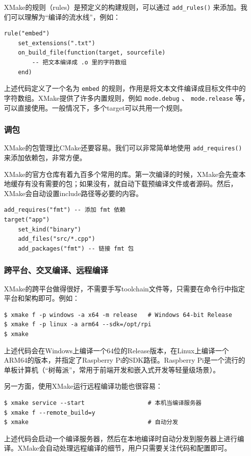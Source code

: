 XMake的规则（rules）是预定义的构建规则，可以通过 \texttt{add\_rules()} 来添加。我们可以理解为“编译的流水线”，例如：
\begin{verbatim}
rule("embed")
    set_extensions(".txt")
    on_build_file(function(target, sourcefile)
        -- 把文本编译成 .o 里的字符数组
    end)
\end{verbatim}
上述代码定义了一个名为 \texttt{embed} 的规则，作用是将文本文件编译成目标文件中的字符数组。XMake提供了许多内置规则，例如 \texttt{mode.debug} 、 \texttt{mode.release} 等，可以直接使用。一般情况下，多个target可以共用一个规则。

\subsubsection{调包}

XMake的包管理比CMake还要容易。我们可以非常简单地使用 \texttt{add\_requires()} 来添加依赖包，非常方便。

XMake的官方仓库有着九百多个常用的库。第一次编译的时候，XMake会先查本地缓存有没有需要的包；如果没有，就自动下载预编译文件或者源码。然后，XMake会自动设置include路径等必要的内容。

\begin{verbatim}
add_requires("fmt") -- 添加 fmt 依赖
target("app")
    set_kind("binary")
    add_files("src/*.cpp")
    add_packages("fmt") -- 链接 fmt 包
\end{verbatim}

\subsubsection{跨平台、交叉编译、远程编译}

XMake的跨平台做得很好，不需要手写toolchain文件等，只需要在命令行中指定平台和架构即可。例如：
\begin{verbatim}
$ xmake f -p windows -a x64 -m release   # Windows 64-bit Release
$ xmake f -p linux -a arm64 --sdk=/opt/rpi
$ xmake
\end{verbatim}
上述代码会在Windows上编译一个64位的Release版本，在Linux上编译一个ARM64的版本，并指定了Raspberry Pi的SDK路径。Raspberry Pi是一个流行的单板计算机（“树莓派”，常用于前端开发和嵌入式开发等轻量级场景）。

另一方面，使用XMake运行远程编译功能也很容易：
\begin{verbatim}
$ xmake service --start                  # 本机当编译服务器
$ xmake f --remote_build=y
$ xmake                                  # 自动分发
\end{verbatim}
上述代码会启动一个编译服务器，然后在本地编译时自动分发到服务器上进行编译。XMake会自动处理远程编译的细节，用户只需要关注代码和配置即可。


